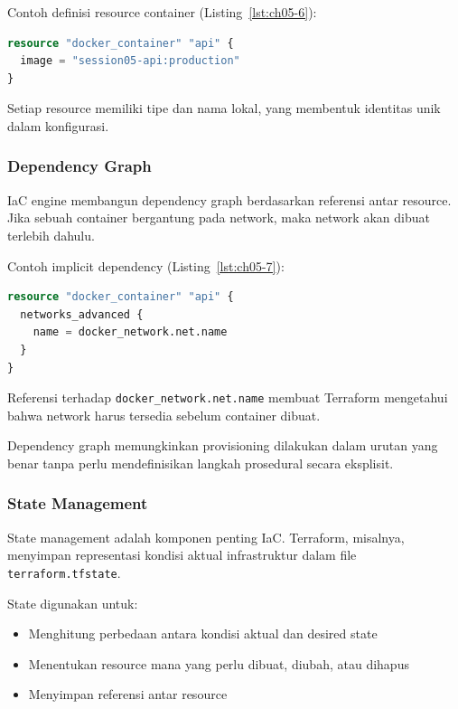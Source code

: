 Contoh definisi resource container (Listing~\ref{lst:ch05-6}):

\begin{lstlisting}[language=terraform, caption={Potongan kode Terraform pada Resource Definition}, label={lst:ch05-6}]
resource "docker_container" "api" {
  image = "session05-api:production"
}
\end{lstlisting}

Setiap resource memiliki tipe dan nama lokal, yang membentuk identitas unik dalam konfigurasi.

\subsubsection*{Dependency Graph}

IaC engine membangun dependency graph berdasarkan referensi antar resource. Jika sebuah container bergantung pada network, maka network akan dibuat terlebih dahulu.

Contoh implicit dependency (Listing~\ref{lst:ch05-7}):

\begin{lstlisting}[language=terraform, caption={Potongan kode Terraform pada Dependency Graph}, label={lst:ch05-7}]
resource "docker_container" "api" {
  networks_advanced {
    name = docker_network.net.name
  }
}
\end{lstlisting}

Referensi terhadap \texttt{docker\_network.net.name} membuat Terraform mengetahui bahwa network harus tersedia sebelum container dibuat.

Dependency graph memungkinkan provisioning dilakukan dalam urutan yang benar tanpa perlu mendefinisikan langkah prosedural secara eksplisit.

\subsubsection*{State Management}

State management adalah komponen penting IaC. Terraform, misalnya, menyimpan representasi kondisi aktual infrastruktur dalam file \texttt{terraform.tfstate}.

State digunakan untuk:

\begin{itemize}
\item Menghitung perbedaan antara kondisi aktual dan desired state
\item Menentukan resource mana yang perlu dibuat, diubah, atau dihapus
\item Menyimpan referensi antar resource
\end{itemize}

